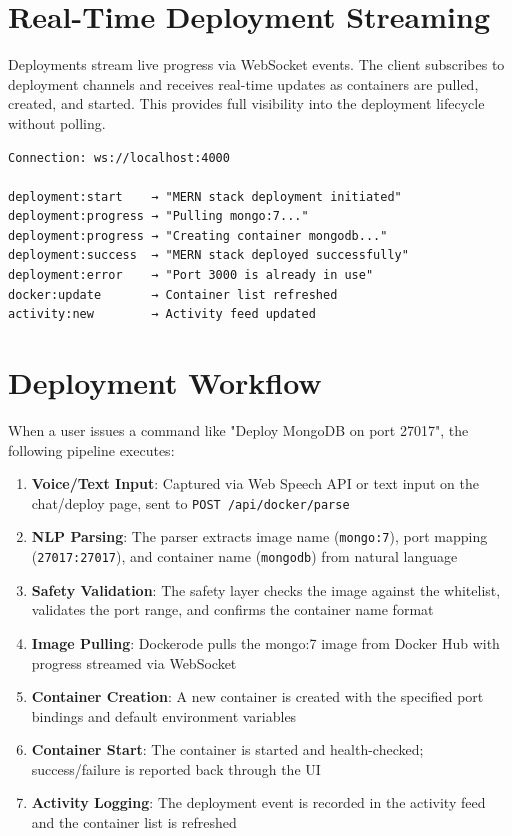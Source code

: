 \documentclass[12pt,a4paper]{report}
\begin{document}
\section{Real-Time Deployment Streaming}
Deployments stream live progress via WebSocket events. The client subscribes to deployment channels and receives real-time updates as containers are pulled, created, and started. This provides full visibility into the deployment lifecycle without polling.

\begin{lstlisting}
Connection: ws://localhost:4000

deployment:start    → "MERN stack deployment initiated"
deployment:progress → "Pulling mongo:7..."
deployment:progress → "Creating container mongodb..."
deployment:success  → "MERN stack deployed successfully"
deployment:error    → "Port 3000 is already in use"
docker:update       → Container list refreshed
activity:new        → Activity feed updated
\end{lstlisting}

\section{Deployment Workflow}
When a user issues a command like "Deploy MongoDB on port 27017", the following pipeline executes:

\begin{enumerate}
  \item \textbf{Voice/Text Input}: Captured via Web Speech API or text input on the chat/deploy page, sent to \texttt{POST /api/docker/parse}
  \item \textbf{NLP Parsing}: The parser extracts image name (\texttt{mongo:7}), port mapping (\texttt{27017:27017}), and container name (\texttt{mongodb}) from natural language
  \item \textbf{Safety Validation}: The safety layer checks the image against the whitelist, validates the port range, and confirms the container name format
  \item \textbf{Image Pulling}: Dockerode pulls the mongo:7 image from Docker Hub with progress streamed via WebSocket
  \item \textbf{Container Creation}: A new container is created with the specified port bindings and default environment variables
  \item \textbf{Container Start}: The container is started and health-checked; success/failure is reported back through the UI
  \item \textbf{Activity Logging}: The deployment event is recorded in the activity feed and the container list is refreshed
\end{enumerate}
\end{document}
